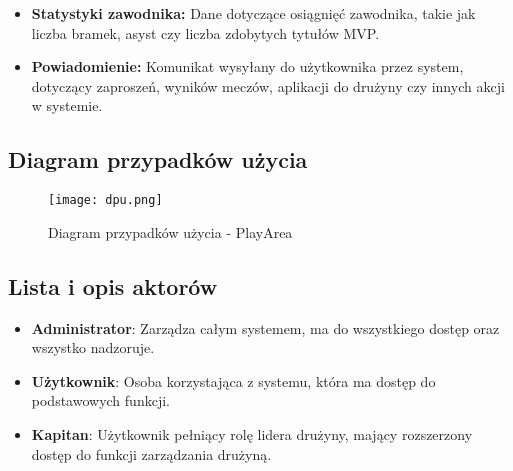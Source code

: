 \documentclass[wmii,inf,inz]{uwmthesis} %
\newenvironment{indenteditemize}
{\begin{itemize}[left=1cm]} %
{\end{itemize}}
\begin{document}
\begin{indenteditemize}
    \item\textbf{Statystyki zawodnika: } 
    Dane dotyczące osiągnięć zawodnika, takie jak liczba bramek, asyst czy liczba zdobytych tytułów MVP.\newline

    \item\textbf{Powiadomienie: } 
    Komunikat wysyłany do użytkownika przez system, dotyczący zaproszeń, wyników meczów, aplikacji do drużyny czy innych akcji w systemie.   \newline 
\end{indenteditemize}

\subsection{Diagram przypadków użycia}
\begin{figure}[H]
    \centering
    \texttt{[image: dpu.png]}
    \caption{Diagram przypadków użycia - PlayArea}
    \label{fig: Diagram przypadków użycia}
\end{figure}

\subsection{Lista i opis aktorów}
\begin{indenteditemize}
    \item \textbf{Administrator}: Zarządza całym systemem, ma do wszystkiego dostęp oraz wszystko nadzoruje.
    \item \textbf{Użytkownik}: Osoba korzystająca z systemu, która ma dostęp do podstawowych funkcji.
    \item \textbf{Kapitan}: Użytkownik pełniący rolę lidera drużyny, mający rozszerzony dostęp do funkcji zarządzania drużyną.
\end{indenteditemize}
\end{document}
